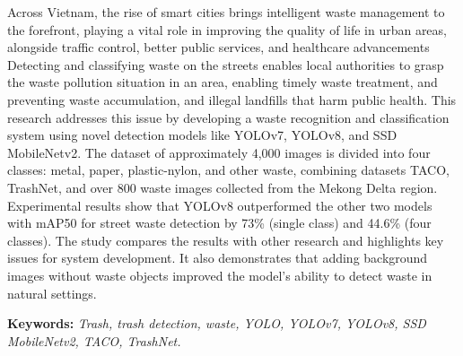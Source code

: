 \documentclass[./thesis.tex]{subfiles}
\begin{document}

{\fontsize{13}{12} \selectfont
Across Vietnam, the rise of smart cities brings intelligent waste management to the forefront, playing a vital role in improving the quality of life in urban areas, alongside traffic control, better public services, and healthcare advancements
Detecting and classifying waste on the streets enables local authorities to grasp the waste pollution situation in an area, enabling timely waste treatment, and preventing waste accumulation, and illegal landfills that harm public health.
This research addresses this issue by developing a waste recognition and classification system using novel detection models like YOLOv7, YOLOv8, and SSD MobileNetv2.
The dataset of approximately 4,000 images is divided into four classes: metal, paper, plastic-nylon, and other waste, combining datasets TACO, TrashNet, and over 800 waste images collected from the Mekong Delta region.
Experimental results show that YOLOv8 outperformed the other two models with mAP50 for street waste detection by 73\% (single class) and 44.6\% (four classes).
The study compares the results with other research and highlights key issues for system development. It also demonstrates that adding background images without waste objects improved the model's ability to detect waste in natural settings.

}
\bigskip

{\bf Keywords:} \textit{Trash, trash detection, waste, YOLO, YOLOv7, YOLOv8, SSD MobileNetv2, TACO, TrashNet.}
\end{document}
